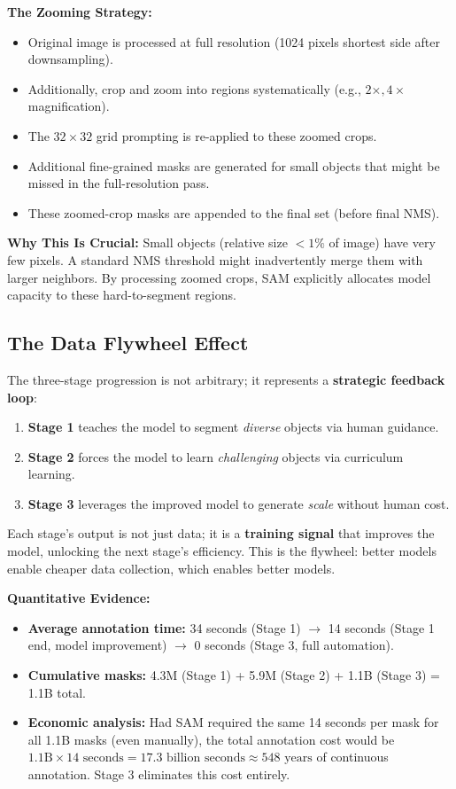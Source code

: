 \textbf{The Zooming Strategy:}
\begin{itemize}
    \item Original image is processed at full resolution (1024 pixels shortest side after downsampling).
    \item Additionally, crop and zoom into regions systematically (e.g., $2\times, 4\times$ magnification).
    \item The $32 \times 32$ grid prompting is re-applied to these zoomed crops.
    \item Additional fine-grained masks are generated for small objects that might be missed in the full-resolution pass.
    \item These zoomed-crop masks are appended to the final set (before final NMS).
\end{itemize}

\textbf{Why This Is Crucial:}
Small objects (relative size $< 1\%$ of image) have very few pixels. A standard NMS threshold might inadvertently merge them with larger neighbors. By processing zoomed crops, SAM explicitly allocates model capacity to these hard-to-segment regions.

\subsection{The Data Flywheel Effect}

The three-stage progression is not arbitrary; it represents a \textbf{strategic feedback loop}:

\begin{enumerate}
    \item \textbf{Stage 1} teaches the model to segment \textit{diverse} objects via human guidance.
    \item \textbf{Stage 2} forces the model to learn \textit{challenging} objects via curriculum learning.
    \item \textbf{Stage 3} leverages the improved model to generate \textit{scale} without human cost.
\end{enumerate}

Each stage's output is not just data; it is a \textbf{training signal} that improves the model, unlocking the next stage's efficiency. This is the flywheel: better models enable cheaper data collection, which enables better models.

\textbf{Quantitative Evidence:}
\begin{itemize}
    \item \textbf{Average annotation time:} 34 seconds (Stage 1) $\rightarrow$ 14 seconds (Stage 1 end, model improvement) $\rightarrow$ 0 seconds (Stage 3, full automation).
    \item \textbf{Cumulative masks:} 4.3M (Stage 1) + 5.9M (Stage 2) + 1.1B (Stage 3) = 1.1B total.
    \item \textbf{Economic analysis:} Had SAM required the same 14 seconds per mask for all 1.1B masks (even manually), the total annotation cost would be $1.1\text{B} \times 14 \text{ seconds} = 17.3 \text{ billion seconds} \approx 548 \text{ years}$ of continuous annotation. Stage 3 eliminates this cost entirely.
\end{itemize}


